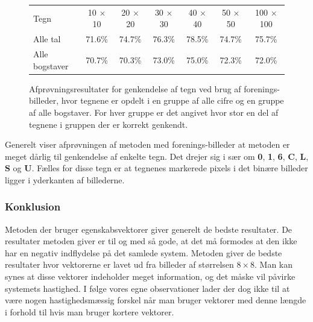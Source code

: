 \begin{figure}[htp]
\centering
\begin{tabular}{|l|c|c|c|c|c|c|}\hline
\rowcolor[gray]{0.9} \multicolumn{7}{|>{\columncolor[gray]{0.9}}c|}{\textbf{Genkendelse af tegn - Forenings-billeder}} \\ \hline
Tegn & 10 $\times$ 10 & 20 $\times$ 20 & 30 $\times$ 30 & 40 $\times$ 40 & 50 $\times$ 50 & 100 $\times$ 100\\\hline
Alle tal & 71.6\% & 74.7\% & 76.3\% & 78.5\% & 74.7\% & 75.7\%\\\hline
Alle bogstaver & 70.7\% & 70.3\% & 73.0\% & 75.0\% & 72.3\% & 72.0\%\\\hline
\end{tabular}
\caption{Afprøvningsresultater for genkendelse af tegn ved brug af forenings-billeder, hvor tegnene er opdelt i en gruppe af alle cifre og en gruppe af alle bogstaver. For hver gruppe er det angivet hvor stor en del af tegnene i gruppen der er korrekt genkendt.}
\label{fig:test:and_alletegn}
\end{figure}

Generelt viser afprøvningen af metoden med forenings-billeder at metoden er meget dårlig til genkendelse af enkelte tegn. Det drejer sig i sær om \textbf{0}, \textbf{1}, \textbf{6}, \textbf{C}, \textbf{L}, \textbf{S} og \textbf{U}. Fælles for disse tegn er at tegnenes markerede pixels i det binære billeder ligger i yderkanten af billederne.


\subsubsection{Konklusion}

Metoden der bruger egenskabsvektorer giver generelt de bedste resultater. De resultater metoden giver er til og med så gode, at det må formodes at den ikke har en negativ indflydelse på det samlede system. Metoden giver de bedste resultater hvor vektorerne er lavet ud fra billeder af størrelsen $8 \times 8$. Man kan synes at disse vektorer indeholder meget information, og det måske vil påvirke systemets hastighed. I følge vores egne observationer lader der dog ikke til at være nogen hastighedsmæssig forskel når man bruger vektorer med denne længde i forhold til hvis man bruger kortere vektorer.

